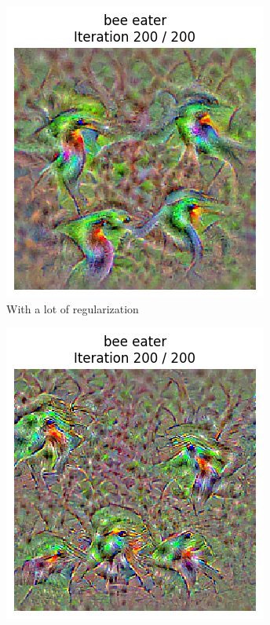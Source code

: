 \begin{figure}[H]
    \centering
    \begin{subfigure}[t]{.33\textwidth}
        \centering
        \includegraphics[width=\linewidth]{figs/2b/SqueezeNet/SqueezeNet_bird_animated_reg++_last_frame.png}
        \caption{With a lot of regularization}
        \label{fig:class_viz_reg:sub1}
    \end{subfigure}%
    \begin{subfigure}[t]{.33\textwidth}
        \centering
        \includegraphics[width=\linewidth]{figs/2b/SqueezeNet/SqueezeNet_bird_animated_last_frame.png}

\end{subfigure}
\end{figure}
